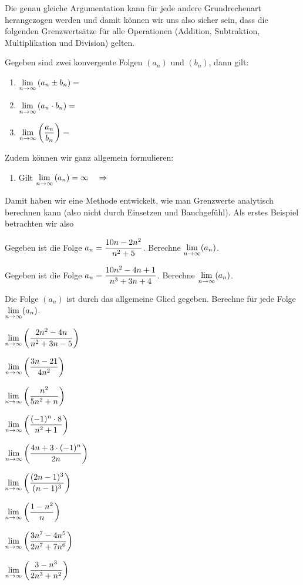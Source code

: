 \documentclass[11pt,oneside]{article}
\begin{document}
Die genau gleiche Argumentation kann für jede andere Grundrechenart herangezogen werden und damit können wir uns also sicher sein, dass die folgenden Grenzwertsätze für alle Operationen (Addition, Subtraktion, Multiplikation und Division) gelten.
\begin{satz}[Grenzwertsätze]
	\label{satz:grenzwertsaetze}
	Gegeben sind zwei konvergente Folgen $(a_n)$ und $(b_n)$, dann gilt:
	\begin{enumerate}[label=\ ,leftmargin=2cm]
		\item $\displaystyle\lim_{n\rightarrow\infty}\left(a_n\pm b_n\right)=$
		\item $\displaystyle\lim_{n\rightarrow\infty}\left(a_n\cdot b_n\right)=$
		\item $\displaystyle\lim_{n\rightarrow\infty}\left(\frac{a_n}{b_n}\right)=$
	\end{enumerate}
	Zudem können wir ganz allgemein formulieren:
	\begin{enumerate}[label=\ ,leftmargin=2cm]
		\item Gilt $\displaystyle\lim_{n\rightarrow\infty}\left(a_n\right)=\infty\quad\Rightarrow$
	\end{enumerate}
\end{satz}
Damit haben wir eine Methode entwickelt, wie man Grenzwerte analytisch berechnen kann (also nicht durch Einsetzen und Bauchgefühl). Als erstes Beispiel betrachten wir also
\begin{beispiel}
	Gegeben ist die Folge $\displaystyle a_n=\frac{10n-2n^2}{n^2+5}$. Berechne $\displaystyle\lim_{n\rightarrow\infty}(a_n)$.\vspace{7pt}\\
\end{beispiel}
\begin{beispiel}
	Gegeben ist die Folge $\displaystyle a_n=\frac{10n^2-4n+1}{n^3+3n+4}$. Berechne $\displaystyle\lim_{n\rightarrow\infty}(a_n)$.\vspace{7pt}\\
\end{beispiel}
\begin{aufgabe}
	Die Folge $(a_n)$ ist durch das allgemeine Glied gegeben. Berechne für jede Folge $\displaystyle\lim_{n\rightarrow\infty}(a_n)$.
	\begin{enumcols}[3]
		\item $\displaystyle\lim_{n\rightarrow\infty}\left(\frac{2n^2-4n}{n^2+3n-5}\right)$
		\item $\displaystyle\lim_{n\rightarrow\infty}\left(\frac{3n-21}{4n^2}\right)$
		\item $\displaystyle\lim_{n\rightarrow\infty}\left(\frac{n^2}{5n^2+n}\right)$
		\item $\displaystyle\lim_{n\rightarrow\infty}\left(\frac{(-1)^n\cdot8}{n^2+1}\right)$
		\item $\displaystyle\lim_{n\rightarrow\infty}\left(\frac{4n+3\cdot(-1)^n}{2n}\right)$
		\item $\displaystyle\lim_{n\rightarrow\infty}\left(\frac{(2n-1)^3}{(n-1)^3}\right)$
		\item $\displaystyle\lim_{n\rightarrow\infty}\left(\frac{1-n^2}{n}\right)$
		\item $\displaystyle\lim_{n\rightarrow\infty}\left(\frac{3n^7-4n^5}{2n^7+7n^6}\right)$
		\item $\displaystyle\lim_{n\rightarrow\infty}\left(\frac{3-n^3}{2n^3+n^2}\right)$
	\end{enumcols}
\end{aufgabe}
\end{document}
